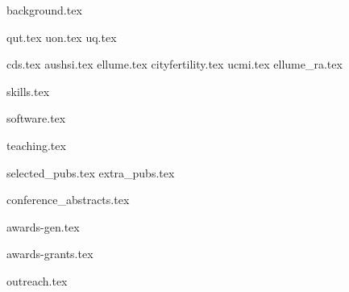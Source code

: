 \documentclass[11pt]{article}
\begin{document}
{background.tex}

{qut.tex}
{uon.tex}
{uq.tex}

\vspace{1mm}
{cds.tex}
{aushsi.tex}
{ellume.tex}
{cityfertility.tex}
{ucmi.tex}
{ellume_ra.tex}

\vspace{1mm}
{skills.tex}

\vspace{1mm}
{software.tex}

\vspace{1mm}
{teaching.tex}

\vspace{1mm}
\begin{enumerate}
	{selected_pubs.tex}
	{extra_pubs.tex}
\end{enumerate}\par

\newpage

\vspace{1mm}
{conference_abstracts.tex}

\vspace{1mm}
{awards-gen.tex}

\vspace{1mm}
{awards-grants.tex}

\vspace{1mm}
{outreach.tex}
\end{document}
